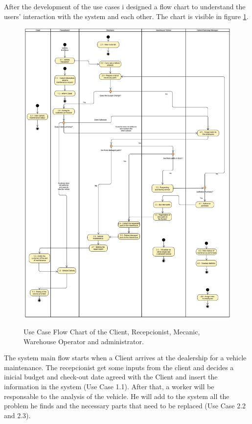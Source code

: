 After the development of the use cases i designed a flow chart to understand the users' interaction with the system and each other. The chart is visible in figure \ref{fig:figure2}.

\begin{figure}[h]
  \caption{Use Case Flow Chart of the Client, Recepcionist, Mecanic, Warehouse Operator and administrator.}
  \centering
  \includegraphics[width=\textwidth]{figs/UseCaseDiagram}
  \label{fig:figure2}
\end{figure}

The system main flow starts when a Client arrives at the dealership for a vehicle maintenance. 
The recepcionist get some inputs from the client and decides a inicial budget and check-out date agreed with the Client and insert the information in the system (Use Case 1.1).
After that, a worker will be responsable to the analysis of the vehicle. 
He will add to the system all the problem he finds and the necessary parts that need to be replaced (Use Case 2.2 and 2.3).


